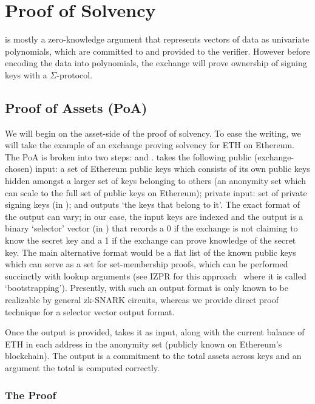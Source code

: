 \chapter{Proof of Solvency}

\Sys is mostly a zero-knowledge argument that represents vectors of data as univariate polynomials, which are committed to and provided to the verifier. However before encoding the data into polynomials, the exchange will prove ownership of signing keys with a $\Sigma$-protocol.

\section{Proof of Assets (PoA)}

We will begin on the asset-side of the proof of solvency. To ease the writing, we will take the example of an exchange proving solvency for ETH on Ethereum. The PoA is broken into two steps: \bootstrap and \poa. \bootstrap takes the following public (exchange-chosen) input: a set of Ethereum public keys which consists of its own public keys hidden amongst a larger set of keys belonging to others (\ie an anonymity set which can scale to the full set of public keys on Ethereum); private input: set of private signing keys (in \secp); and outputs `the keys that belong to it'. The exact format of the output can vary; in our case, the input keys are indexed and the output is a binary `selector' vector (in \bls) that records a 0 if the exchange is not claiming to know the secret key and a 1 if the exchange can prove knowledge of the secret key. The main alternative format would be a flat list of the known public keys which can serve as a set for set-membership proofs, which can be performed succinctly with lookup arguments (see IZPR for this approach~\cite{izpr} where it is called `bootstrapping'). Presently, \bootstrap with such an output format is only known to be realizable by general zk-SNARK circuits, whereas we provide direct proof technique for a selector vector output format.

Once the \bootstrap output is provided, \poa takes it as input, along with the current balance of ETH in each address in the anonymity set (publicly known on Ethereum's blockchain). The output is a commitment to the total assets across keys and an argument the total is computed correctly. 


\subsection{The \bootstrap Proof}

